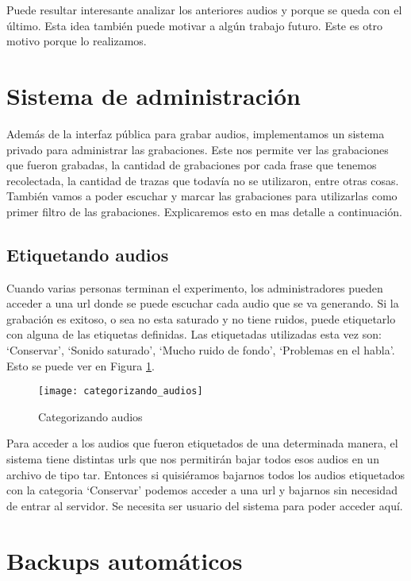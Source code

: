 Puede resultar interesante analizar los anteriores audios y porque se queda con el último. Esta idea también puede motivar a algún trabajo futuro. Este es otro motivo porque lo realizamos.

\section{Sistema de administración}

Además de la interfaz pública para grabar audios, implementamos un sistema privado para administrar las grabaciones. Este nos permite ver las grabaciones que fueron grabadas, la cantidad de grabaciones por cada frase que tenemos recolectada, la cantidad de trazas que todavía no se utilizaron, entre otras cosas. También vamos a poder escuchar y marcar las grabaciones para utilizarlas como primer filtro de las grabaciones. Explicaremos esto en mas detalle a continuación.

\subsection{Etiquetando audios}

Cuando varias personas terminan el experimento, los administradores pueden acceder a una url donde se puede escuchar cada audio que se va generando. Si la grabación es exitoso, o sea no esta saturado y no tiene ruidos, puede etiquetarlo con alguna de las etiquetas definidas. Las etiquetadas utilizadas esta vez son: `Conservar’,  `Sonido saturado’, `Mucho ruido de fondo’, `Problemas en el habla’. Esto se puede ver en Figura \ref{cat}.

\begin{figure}[h!]
    \centerline{\texttt{[image: categorizando\_audios]} }
    \caption{Categorizando audios}
    \label{cat}
\end{figure}

Para acceder a los audios que fueron etiquetados de una determinada manera, el sistema tiene distintas urls que nos permitirán bajar todos esos audios en un archivo de tipo tar. Entonces si quisiéramos bajarnos todos los audios etiquetados con la categoria `Conservar’ podemos acceder a una url y bajarnos sin necesidad de entrar al servidor. Se necesita ser usuario del sistema para poder acceder aquí.

\section{Backups automáticos}

